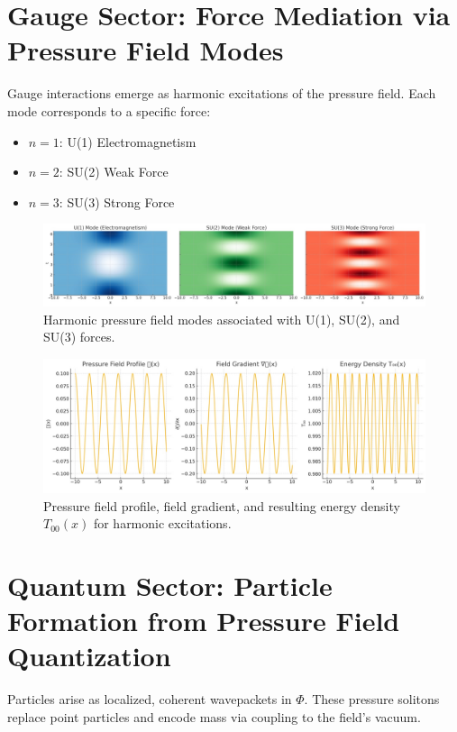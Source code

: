 \documentclass[12pt]{article}
\begin{document}
\section{Gauge Sector: Force Mediation via Pressure Field Modes}
Gauge interactions emerge as harmonic excitations of the pressure field. Each mode corresponds to a specific force:
\begin{itemize}
    \item $n = 1$: U(1) Electromagnetism
    \item $n = 2$: SU(2) Weak Force
    \item $n = 3$: SU(3) Strong Force
\end{itemize}

\begin{figure}[h]
\centering
\includegraphics[width=\textwidth]{Field_Modes_U1_SU2_SU3.jpeg}
\caption{Harmonic pressure field modes associated with U(1), SU(2), and SU(3) forces.}
\end{figure}

\begin{figure}[h]
\centering
\includegraphics[width=\textwidth]{Energy_Density_Profile.jpeg}
\caption{Pressure field profile, field gradient, and resulting energy density $T_{00}(x)$ for harmonic excitations.}
\end{figure}

\section{Quantum Sector: Particle Formation from Pressure Field Quantization}
Particles arise as localized, coherent wavepackets in $\Phi$. These pressure solitons replace point particles and encode mass via coupling to the field’s vacuum.
\end{document}

